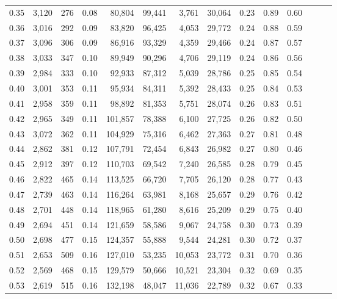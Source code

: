 \begin{tabular}{rrrrrrrrrrrrrr}
0.35 &  3,120 &  276 &  0.08 &   80,804 &   99,441 &   3,761 &  30,064 &  0.23 &  0.89 &      0.60 \\
0.36 &  3,016 &  292 &  0.09 &   83,820 &   96,425 &   4,053 &  29,772 &  0.24 &  0.88 &      0.59 \\
0.37 &  3,096 &  306 &  0.09 &   86,916 &   93,329 &   4,359 &  29,466 &  0.24 &  0.87 &      0.57 \\
0.38 &  3,033 &  347 &  0.10 &   89,949 &   90,296 &   4,706 &  29,119 &  0.24 &  0.86 &      0.56 \\
0.39 &  2,984 &  333 &  0.10 &   92,933 &   87,312 &   5,039 &  28,786 &  0.25 &  0.85 &      0.54 \\
0.40 &  3,001 &  353 &  0.11 &   95,934 &   84,311 &   5,392 &  28,433 &  0.25 &  0.84 &      0.53 \\
0.41 &  2,958 &  359 &  0.11 &   98,892 &   81,353 &   5,751 &  28,074 &  0.26 &  0.83 &      0.51 \\
0.42 &  2,965 &  349 &  0.11 &  101,857 &   78,388 &   6,100 &  27,725 &  0.26 &  0.82 &      0.50 \\
0.43 &  3,072 &  362 &  0.11 &  104,929 &   75,316 &   6,462 &  27,363 &  0.27 &  0.81 &      0.48 \\
0.44 &  2,862 &  381 &  0.12 &  107,791 &   72,454 &   6,843 &  26,982 &  0.27 &  0.80 &      0.46 \\
0.45 &  2,912 &  397 &  0.12 &  110,703 &   69,542 &   7,240 &  26,585 &  0.28 &  0.79 &      0.45 \\
0.46 &  2,822 &  465 &  0.14 &  113,525 &   66,720 &   7,705 &  26,120 &  0.28 &  0.77 &      0.43 \\
0.47 &  2,739 &  463 &  0.14 &  116,264 &   63,981 &   8,168 &  25,657 &  0.29 &  0.76 &      0.42 \\
0.48 &  2,701 &  448 &  0.14 &  118,965 &   61,280 &   8,616 &  25,209 &  0.29 &  0.75 &      0.40 \\
0.49 &  2,694 &  451 &  0.14 &  121,659 &   58,586 &   9,067 &  24,758 &  0.30 &  0.73 &      0.39 \\
0.50 &  2,698 &  477 &  0.15 &  124,357 &   55,888 &   9,544 &  24,281 &  0.30 &  0.72 &      0.37 \\
0.51 &  2,653 &  509 &  0.16 &  127,010 &   53,235 &  10,053 &  23,772 &  0.31 &  0.70 &      0.36 \\
0.52 &  2,569 &  468 &  0.15 &  129,579 &   50,666 &  10,521 &  23,304 &  0.32 &  0.69 &      0.35 \\
0.53 &  2,619 &  515 &  0.16 &  132,198 &   48,047 &  11,036 &  22,789 &  0.32 &  0.67 &      0.33 \\

\end{tabular}
